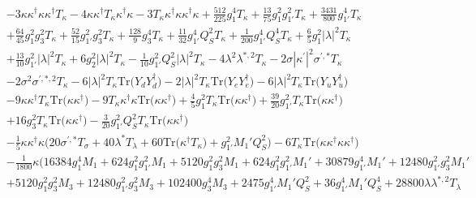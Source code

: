 {\begin{align}
 &-3 {\kappa  \kappa^{\dagger}  \kappa  \kappa^{\dagger}  T_{\kappa}} -4 {\kappa  \kappa^{\dagger}  T_{\kappa}  \kappa^{\dagger}  \kappa} -3 {T_{\kappa}  \kappa^{\dagger}  \kappa  \kappa^{\dagger}  \kappa} +\frac{512}{225} g_{1}^{4} T_{\kappa} +\frac{13}{75} g_{1}^{2} g_{1'}^{2} T_{\kappa} +\frac{3431}{800} g_{1'}^{4} T_{\kappa} \nonumber \\ 
 &+\frac{64}{45} g_{1}^{2} g_{3}^{2} T_{\kappa} +\frac{52}{15} g_{1'}^{2} g_{3}^{2} T_{\kappa} +\frac{128}{9} g_{3}^{4} T_{\kappa} +\frac{11}{32} g_{1'}^{4} Q_{S}^{2} T_{\kappa} +\frac{1}{200} g_{1'}^{4} Q_{S}^{4} T_{\kappa} +\frac{6}{5} g_{1}^{2} |\lambda|^2 T_{\kappa} \nonumber \\ 
 &+\frac{13}{10} g_{1'}^{2} |\lambda|^2 T_{\kappa} +6 g_{2}^{2} |\lambda|^2 T_{\kappa} -\frac{1}{10} g_{1'}^{2} Q_{S}^{2} |\lambda|^2 T_{\kappa} -4 \lambda^{2} \lambda^{*,2} T_{\kappa} -2 \sigma |\kappa^\prime|^2 \sigma^{\prime,*} T_{\kappa} \nonumber \\ 
 &-2 \sigma^{2} \sigma^{\prime,*,2} T_{\kappa} -6 |\lambda|^2 T_{\kappa} \mbox{Tr}\Big({Y_d  Y_{d}^{\dagger}}\Big) -2 |\lambda|^2 T_{\kappa} \mbox{Tr}\Big({Y_e  Y_{e}^{\dagger}}\Big) -6 |\lambda|^2 T_{\kappa} \mbox{Tr}\Big({Y_u  Y_{u}^{\dagger}}\Big) \nonumber \\ 
 &-9 {\kappa  \kappa^{\dagger}  T_{\kappa}} \mbox{Tr}\Big({\kappa  \kappa^{\dagger}}\Big) -9 {T_{\kappa}  \kappa^{\dagger}  \kappa} \mbox{Tr}\Big({\kappa  \kappa^{\dagger}}\Big) +\frac{4}{5} g_{1}^{2} T_{\kappa} \mbox{Tr}\Big({\kappa  \kappa^{\dagger}}\Big) +\frac{39}{20} g_{1'}^{2} T_{\kappa} \mbox{Tr}\Big({\kappa  \kappa^{\dagger}}\Big) \nonumber \\ 
 &+16 g_{3}^{2} T_{\kappa} \mbox{Tr}\Big({\kappa  \kappa^{\dagger}}\Big) -\frac{3}{20} g_{1'}^{2} Q_{S}^{2} T_{\kappa} \mbox{Tr}\Big({\kappa  \kappa^{\dagger}}\Big) \nonumber \\ 
 &-\frac{1}{5} {\kappa  \kappa^{\dagger}  \kappa} \Big(20 \sigma^{\prime,*} T_{\sigma}  + 40 \lambda^* T_{\lambda}  + 60 \mbox{Tr}\Big({\kappa^{\dagger}  T_{\kappa}}\Big)  + g_{1'}^{2} M_1' Q_{S}^{2} \Big)-6 T_{\kappa} \mbox{Tr}\Big({\kappa  \kappa^{\dagger}  \kappa  \kappa^{\dagger}}\Big) \nonumber \\ 
 &-\frac{1}{1800} \kappa \Big(16384 g_{1}^{4} M_1 +624 g_{1}^{2} g_{1'}^{2} M_1 +5120 g_{1}^{2} g_{3}^{2} M_1 +624 g_{1}^{2} g_{1'}^{2} M_1' +30879 g_{1'}^{4} M_1' +12480 g_{1'}^{2} g_{3}^{2} M_1' \nonumber \\ 
 &+5120 g_{1}^{2} g_{3}^{2} M_3 +12480 g_{1'}^{2} g_{3}^{2} M_3 +102400 g_{3}^{4} M_3 +2475 g_{1'}^{4} M_1' Q_{S}^{2} +36 g_{1'}^{4} M_1' Q_{S}^{4} +28800 \lambda \lambda^{*,2} T_{\lambda} \nonumber \\ 

\end{align}}
